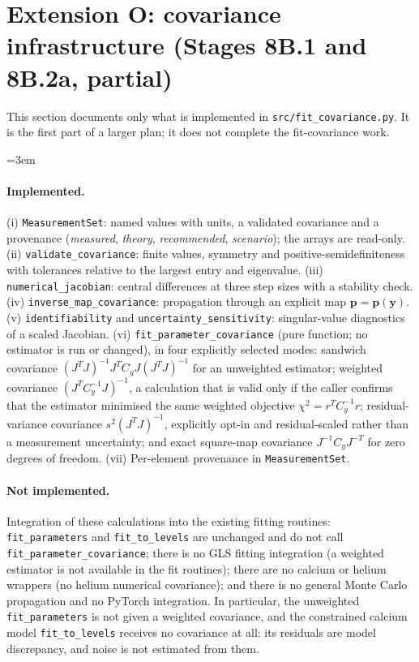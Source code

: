 \section{Extension O: covariance infrastructure (Stages 8B.1 and 8B.2a, partial)}

This section documents only what is implemented in \texttt{src/fit\_covariance.py}. It is the first part of a larger plan; it does not complete the fit-covariance work.

\emergencystretch=3em
\paragraph{Implemented.} (i) \texttt{MeasurementSet}: named values with units, a validated covariance and a provenance (\emph{measured}, \emph{theory}, \emph{recommended}, \emph{scenario}); the arrays are read-only. (ii) \texttt{validate\_covariance}: finite values, symmetry and positive-semidefiniteness with tolerances relative to the largest entry and eigenvalue. (iii) \texttt{numerical\_jacobian}: central differences at three step sizes with a stability check. (iv) \texttt{inverse\_map\_covariance}: propagation through an explicit map $\mathbf p=\mathbf p(\mathbf y)$. (v) \texttt{identifiability} and \texttt{uncertainty\_sensitivity}: singular-value diagnostics of a scaled Jacobian. (vi) \texttt{fit\_parameter\_covariance} (pure function; no estimator is run or changed), in four explicitly selected modes: sandwich covariance $(J^TJ)^{-1}J^TC_yJ(J^TJ)^{-1}$ for an unweighted estimator; weighted covariance $(J^{T}C_y^{-1}J)^{-1}$, a calculation that is valid only if the caller confirms that the estimator minimised the same weighted objective $\chi^2=r^TC_y^{-1}r$; residual-variance covariance $s^2(J^{T}J)^{-1}$, explicitly opt-in and residual-scaled rather than a measurement uncertainty; and exact square-map covariance $J^{-1}C_yJ^{-T}$ for zero degrees of freedom. (vii) Per-element provenance in \texttt{MeasurementSet}.

\paragraph{Not implemented.} Integration of these calculations into the existing fitting routines: \texttt{fit\_parameters} and \texttt{fit\_to\_levels} are unchanged and do not call \texttt{fit\_parameter\_\allowbreak covariance}; there is no GLS fitting integration (a weighted estimator is not available in the fit routines); there are no calcium or helium wrappers (no helium numerical covariance); and there is no general Monte Carlo propagation and no PyTorch integration. In particular, the unweighted \texttt{fit\_parameters} is not given a weighted covariance, and the constrained calcium model \texttt{fit\_to\_levels} receives no covariance at all: its residuals are model discrepancy, and noise is not estimated from them.

